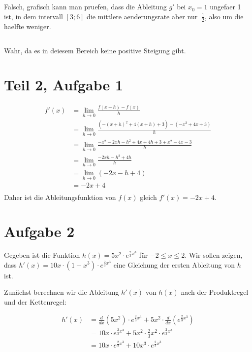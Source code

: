\documentclass{report}
\begin{document}
\begin{multicols}{2}
\section{}
\subsection{}
Falsch, grafisch kann man pruefen, dass die Ableitung $g'$ bei $x_0=1$ ungefaer
1 ist, in dem intervall $[3;6]$ die mittlere aenderungsrate aber nur $~
\frac{1}{2}$, also um die haelfte weniger.

\subsection{}
Wahr, da es in deiesem Bereich keine positive Steigung gibt.
\end{multicols}

\section*{Teil 2, Aufgabe 1}
\begin{align*}
  f'(x)&=\lim_{h\to 0}\frac{f(x+h)-f(x)}{h}\\
       &=\lim_{h\to 0}\frac{(-(x+h)^2+4(x+h)+3)-(-x^2+4x+3)}{h}\\
       &=\lim_{h\to 0}\frac{-x^2-2xh-h^2+4x+4h+3+x^2-4x-3}{h}\\
       &=\lim_{h\to 0}\frac{-2xh-h^2+4h}{h}\\
       &=\lim_{h\to 0}(-2x-h+4)\\
       &=-2x+4\\
\end{align*}
Daher ist die Ableitungsfunktion von $f(x)$ gleich $f'(x)=-2x+4$.

\section*{Aufgabe 2}

Gegeben ist die Funktion $h(x) = 5x^2 \cdot e^{\frac{2}{3} x^3}$ für $-2 \leq x
\leq 2$. Wir sollen zeigen, dass $h'(x) = 10x \cdot (1+x^3) \cdot
e^{\frac{2}{3} x^3}$ eine Gleichung der ersten Ableitung von $h$ ist.

Zunächst berechnen wir die Ableitung $h'(x)$ von $h(x)$ nach der Produktregel
und der Kettenregel:

\begin{align*}
h'(x) &= \frac{d}{dx}(5x^2) \cdot e^{\frac{2}{3} x^3} + 5x^2 \cdot \frac{d}{dx}(e^{\frac{2}{3} x^3})\\
      &= 10x \cdot e^{\frac{2}{3} x^3} + 5x^2 \cdot \frac{2}{3} x^2 \cdot e^{\frac{2}{3} x^3}\\
      &= 10x \cdot e^{\frac{2}{3} x^3} + 10x^3 \cdot e^{\frac{2}{3} x^3}
\end{align*}
\end{document}
